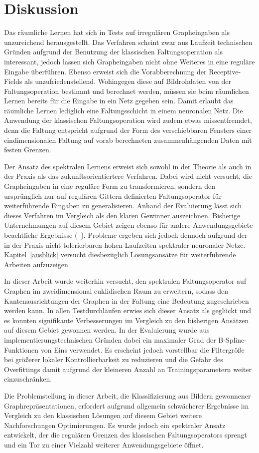 \section{Diskussion}
\label{diskussion}

Das räumliche Lernen hat sich in Tests auf irregulären Grapheingaben als unzureichend herausgestellt.
Das Verfahren scheint zwar aus Laufzeit technischen Gründen aufgrund der Benutzung der klassischen Faltungsoperation als interessant, jedoch lassen sich Grapheingaben nicht ohne Weiteres in eine reguläre Eingabe überführen.
Ebenso erweist sich die Vorabberechnung der Receptive-Fields als unzufriedenstellend.
Wohingegen diese auf Bildrohdaten von der Faltungsoperation bestimmt und berechnet werden, müssen sie beim räumlichen Lernen bereits für die Eingabe in ein Netz gegeben sein.
Damit erlaubt das räumliche Lernen lediglich eine Faltungsschicht in einem neuronalen Netz.
Die Anwendung der klassischen Faltungsoperation wird zudem etwas missentfremdet, denn die Faltung entspricht aufgrund der Form des verschiebbaren Fensters einer eindimensionalen Faltung auf vorab berechneten zusammenhängenden Daten mit festen Grenzen.

Der Ansatz des spektralen Lernens erweist sich sowohl in der Theorie als auch in der Praxis als das zukunftsorientiertere Verfahren.
Dabei wird nicht versucht, die Grapheingaben in eine reguläre Form zu transformieren, sondern den ursprünglich nur auf regulären Gittern definierten Faltungsoperator für weiterführende Eingaben zu generalisieren.
Anhand der Evaluierung lässt sich dieses Verfahren im Vergleich als den klaren Gewinner auszeichnen.
Bisherige Unternehmungen auf diesem Gebiet zeigen ebenso für andere Anwendungsgebiete beachtliche Ergebnisse (\vgl{}~\cite{Defferrard, gcn}).
Probleme ergeben sich jedoch dennoch aufgrund der in der Praxis nicht tolerierbaren hohen Laufzeiten spektraler neuronaler Netze.
Kapitel~\ref{ausblick} versucht diesbezüglich Lösungsansätze für weiterführende Arbeiten aufzuzeigen.

In dieser Arbeit wurde weiterhin versucht, den spektralen Faltungsoperator auf Graphen im zweidimensional euklidischen Raum zu erweitern, sodass den Kantenausrichtungen der Graphen in der Faltung eine Bedeutung zugeschrieben werden kann.
In allen Testdurchläufen erwies sich dieser Ansatz als geglückt und es konnten signifikante Verbesserungen im Vergleich zu den bisherigen Ansätzen auf diesem Gebiet gewonnen werden.
In der Evaluierung wurde aus implementierungstechnischen Gründen dabei ein maximaler Grad der B-Spline-Funktionen von Eins verwendet.
Es erscheint jedoch vorstellbar die Filtergröße bei größerer lokaler Kontrollierbarkeit zu reduzieren und die Gefahr des Overfittings damit aufgrund der kleineren Anzahl an Trainingsparametern weiter einzuschränken.

Die Problemstellung in dieser Arbeit, die Klassifizierung aus Bildern gewonnener Graphrepräsentationen, erfordert aufgrund allgemein schwächerer Ergebnisse im Vergleich zu den klassischen Lösungen auf diesem Gebiet weitere Nachforschungen \bzw{} Optimierungen.
Es wurde jedoch ein spektraler Ansatz entwickelt, der die regulären Grenzen des klassischen Faltungsoperators sprengt und ein Tor zu einer Vielzahl weiterer Anwendungsgebiete öffnet.
